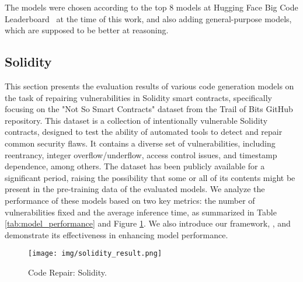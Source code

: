 The models were chosen according to the top 8 models at Hugging Face Big Code Leaderboard~\cite{huggingfaceCodeModels} at the time of this work, and also adding general-purpose models, which are supposed to be better at reasoning.

\subsection{Solidity}

This section presents the evaluation results of various code generation models on the task of repairing vulnerabilities in Solidity smart contracts, specifically focusing on the "Not So Smart Contracts" dataset from the Trail of Bits GitHub repository. This dataset is a collection of intentionally vulnerable Solidity contracts, designed to test the ability of automated tools to detect and repair common security flaws. It contains a diverse set of vulnerabilities, including reentrancy, integer overflow/underflow, access control issues, and timestamp dependence, among others. The dataset has been publicly available for a significant period, raising the possibility that some or all of its contents might be present in the pre-training data of the evaluated models. We analyze the performance of these models based on two key metrics: the number of vulnerabilities fixed and the average inference time, as summarized in Table \ref{tab:model_performance} and Figure \ref{fig:solidityrepair}. We also introduce our framework, \sln{}, and demonstrate its effectiveness in enhancing model performance.

\begin{figure}
    \centering
    \texttt{[image: img/solidity\_result.png]}
    \caption{Code Repair: Solidity.}
    \label{fig:solidityrepair}
\end{figure}

